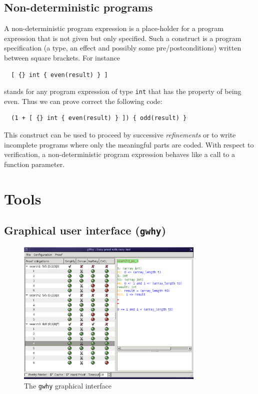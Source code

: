 \documentclass[a4paper,12pt]{report}
\makeatletter
\newcommand{\indextt}[1]{\index{#1@\texttt{#1}}}
\makeatother
\begin{document}
\subsection{Non-deterministic programs}

A non-deterministic program expression is a place-holder for a program
expression that is not given but only specified. Such a construct is
a program specification (a type, an effect and possibly some
pre/postconditions) written between square brackets. For instance
\begin{verbatim}
  [ {} int { even(result) } ]
\end{verbatim}
stands for any program expression of type \texttt{int} that has the
property of being even. Thus we can prove correct the following code:
\begin{verbatim}
  (1 + [ {} int { even(result) } ]) { odd(result) }
\end{verbatim}
This construct can be used to proceed by successive \emph{refinements}
or to write incomplete programs where only the meaningful parts are
coded. With respect to verification, a non-deterministic program
expression behaves like a call to a function parameter.

\section{Tools}\label{tools}

\subsection{Graphical user interface (\texttt{gwhy})}
\indextt{gwhy}

\begin{figure}
  \centering
  \includegraphics[width=0.8\textwidth]{gwhy-screenshot.eps}
  \caption{The \texttt{gwhy} graphical interface}
  \label{fig:gwhy}
\end{figure}
\end{document}
